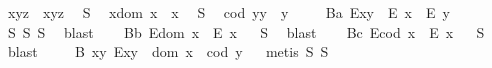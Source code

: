 \begin{isabellebody}
{}
\ {\isachardoublequoteopen}x{\isasymcdot}{\isacharparenleft}y{\isasymcdot}z{\isacharparenright}\ {\isasymcong}\ {\isacharparenleft}x{\isasymcdot}y{\isacharparenright}{\isasymcdot}z{\isachardoublequoteclose}\ \isanewline
\ S{}{\isacharcolon}\ %
\ {\isachardoublequoteopen}x{\isasymcdot}{\isacharparenleft}dom\ x{\isacharparenright}\ {\isasymcong}\ x{\isachardoublequoteclose}\ \isanewline
\ S{}{\isacharcolon}\ %
\ {\isachardoublequoteopen}{\isacharparenleft}cod\ y{\isacharparenright}{\isasymcdot}y\ {\isasymcong}\ y{\isachardoublequoteclose}\ \isanewline
\isanewline
\ \ \isamarkupfalse%
\ B{}a{\isacharcolon}\ {\isachardoublequoteopen}E{\isacharparenleft}x{\isasymcdot}y{\isacharparenright}\ \isactrlbold {\isasymrightarrow}\ {\isacharparenleft}E\ x\ \isactrlbold {\isasymand}\ E\ y{\isacharparenright}{\isachardoublequoteclose}%
\isadelimproof
\ %
\endisadelimproof
%
\isatagproof
{}\isamarkupfalse%
\ S{}\ S{}\ S{}\ \isamarkupfalse%
\ blast%
\endisatagproof
{\isafoldproof}%
%
\isadelimproof
%
\endisadelimproof
\isanewline
\ \ \isamarkupfalse%
\ B{}b{\isacharcolon}\ {\isachardoublequoteopen}E{\isacharparenleft}dom\ x{\isacharparenright}\ \isactrlbold {\isasymrightarrow}\ E\ x{\isachardoublequoteclose}%
\isadelimproof
\ %
\endisadelimproof
%
\isatagproof
{}\isamarkupfalse%
\ S{}\ \isamarkupfalse%
\ blast%
\endisatagproof
{\isafoldproof}%
%
\isadelimproof
%
\endisadelimproof
\isanewline
\ \ \isamarkupfalse%
\ B{}c{\isacharcolon}\ {\isachardoublequoteopen}E{\isacharparenleft}cod\ x{\isacharparenright}\ \isactrlbold {\isasymrightarrow}\ E\ x{\isachardoublequoteclose}%
\isadelimproof
\ %
\endisadelimproof
%
\isatagproof
{}\isamarkupfalse%
\ S{}\ \isamarkupfalse%
\ blast%
\endisatagproof
{\isafoldproof}%
%
\isadelimproof
%
\endisadelimproof
\isanewline
\ \ \isamarkupfalse%
\ \ B{}{\isacharcolon}\ {\isachardoublequoteopen}\isactrlbold {\isasymforall}x{\isachardot}\isactrlbold {\isasymforall}y{\isachardot}\ E{\isacharparenleft}x{\isasymcdot}y{\isacharparenright}\ \isactrlbold {\isasymleftrightarrow}\ dom\ x\ {\isasymcong}\ cod\ y{\isachardoublequoteclose}%
\isadelimproof
\ %
\endisadelimproof
%
\isatagproof
{}\isamarkupfalse%
\ {\isacharparenleft}metis\ S{}\ S{}{\isacharparenright}%

\end{isabellebody}
